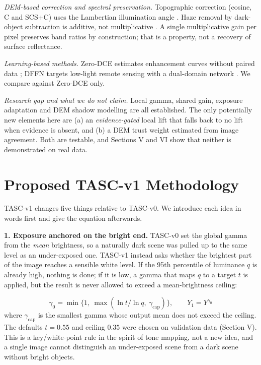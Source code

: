 \documentclass[conference]{IEEEtran}
\begin{document}
\emph{DEM-based correction and spectral preservation.} Topographic correction (cosine, C and SCS+C) uses the Lambertian illumination angle \cite{teillet1982ccorr,soenen2005scsc,horn1981hillshading}. Haze removal by dark-object subtraction is additive, not multiplicative \cite{chavez1988dos}. A single multiplicative gain per pixel preserves band ratios by construction; that is a property, not a recovery of surface reflectance.

\emph{Learning-based methods.} Zero-DCE estimates enhancement curves without paired data \cite{guo2020zerodce}; DFFN targets low-light remote sensing with a dual-domain network \cite{yao2024dffn}. We compare against Zero-DCE only.

\emph{Research gap and what we do not claim.} Local gamma, shared gain, exposure adaptation and DEM shadow modelling are all established. The only potentially new elements here are (a) an \emph{evidence-gated} local lift that falls back to no lift when evidence is absent, and (b) a DEM trust weight estimated from image agreement. Both are testable, and Sections V and VI show that neither is demonstrated on real data.

\section{Proposed TASC-v1 Methodology}
TASC-v1 changes five things relative to TASC-v0. We introduce each idea in words first and give the equation afterwards.

\textbf{1. Exposure anchored on the bright end.} TASC-v0 set the global gamma from the \emph{mean} brightness, so a naturally dark scene was pulled up to the same level as an under-exposed one. TASC-v1 instead asks whether the brightest part of the image reaches a sensible white level. If the 95th percentile of luminance $q$ is already high, nothing is done; if it is low, a gamma that maps $q$ to a target $t$ is applied, but the result is never allowed to exceed a mean-brightness ceiling:

\begin{equation}
\gamma_0 = \min\{1,\ \max(\ln t/\ln q,\ \gamma_{\mathrm{cap}})\}, \qquad Y_1 = Y^{\gamma_0}
\end{equation}
where $\gamma_{\mathrm{cap}}$ is the smallest gamma whose output mean does not exceed the ceiling. The defaults $t = 0.55$ and ceiling $0.35$ were chosen on validation data (Section V). This is a key/white-point rule in the spirit of tone mapping, not a new idea, and a single image cannot distinguish an under-exposed scene from a dark scene without bright objects.
\end{document}
